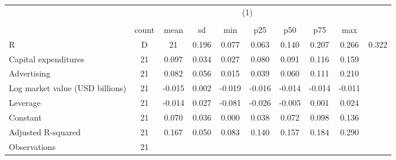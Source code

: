 {
\def\sym#1{\ifmmode^{#1}\else\(^{#1}\)\fi}
\begin{tabular}{l*{1}{cccccccc}}
\hline\hline
                    &                                                                                \\
                    &                                                                                   \\
                    &       count&        mean&          sd&         min&         p25&         p50&         p75&         max\\
\hline
R&D                 &          21&       0.196&       0.077&       0.063&       0.140&       0.207&       0.266&       0.322\\
Capital expenditures&          21&       0.097&       0.034&       0.027&       0.080&       0.091&       0.116&       0.159\\
Advertising         &          21&       0.082&       0.056&       0.015&       0.039&       0.060&       0.111&       0.210\\
Log market value (USD billions)&          21&      -0.015&       0.002&      -0.019&      -0.016&      -0.014&      -0.014&      -0.011\\
Leverage            &          21&      -0.014&       0.027&      -0.081&      -0.026&      -0.005&       0.001&       0.024\\
Constant            &          21&       0.070&       0.036&       0.000&       0.038&       0.072&       0.098&       0.136\\
Adjusted R-squared  &          21&       0.167&       0.050&       0.083&       0.140&       0.157&       0.184&       0.290\\
\hline
Observations        &          21&            &            &            &            &            &            &            \\
\hline\hline
\end{tabular}
}
